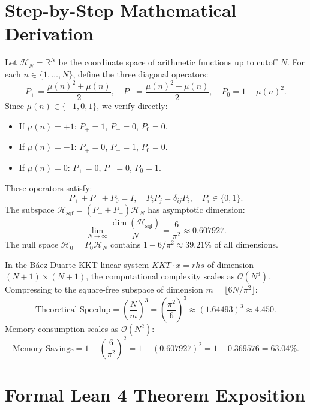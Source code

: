 \documentclass[11pt,a4paper]{article}
\theoremstyle{definition}
\begin{document}
\section{Step-by-Step Mathematical Derivation}

Let $\mathcal{H}_N = \mathbb{R}^N$ be the coordinate space of arithmetic functions up to cutoff $N$. For each $n \in \{1, \dots, N\}$, define the three diagonal operators:
\begin{equation}
P_+ = \frac{\mu(n)^2 + \mu(n)}{2}, \quad P_- = \frac{\mu(n)^2 - \mu(n)}{2}, \quad P_0 = 1 - \mu(n)^2.
\end{equation}
Since $\mu(n) \in \{-1, 0, 1\}$, we verify directly:
\begin{itemize}
\item If $\mu(n) = +1$: $P_+ = 1$, $P_- = 0$, $P_0 = 0$.
\item If $\mu(n) = -1$: $P_+ = 0$, $P_- = 1$, $P_0 = 0$.
\item If $\mu(n) = 0$: $P_+ = 0$, $P_- = 0$, $P_0 = 1$.
\end{itemize}
These operators satisfy:
\begin{equation}
P_+ + P_- + P_0 = I, \quad P_i P_j = \delta_{ij} P_i, \quad P_i \in \{0, 1\}.
\end{equation}
The subspace $\mathcal{H}_{\mathrm{sqf}} = (P_+ + P_-) \mathcal{H}_N$ has asymptotic dimension:
\begin{equation}
\lim_{N \to \infty} \frac{\dim(\mathcal{H}_{\mathrm{sqf}})}{N} = \frac{6}{\pi^2} \approx 0.607927.
\end{equation}
The null space $\mathcal{H}_0 = P_0 \mathcal{H}_N$ contains $1 - 6/\pi^2 \approx 39.21\%$ of all dimensions.

In the Báez-Duarte KKT linear system $KKT \cdot x = rhs$ of dimension $(N+1) \times (N+1)$, the computational complexity scales as $\mathcal{O}(N^3)$. Compressing to the square-free subspace of dimension $m = \lfloor 6N/\pi^2 \rfloor$:
\begin{equation}
\text{Theoretical Speedup} = \left(\frac{N}{m}\right)^3 = \left(\frac{\pi^2}{6}\right)^3 \approx (1.64493)^3 \approx 4.450.
\end{equation}
Memory consumption scales as $\mathcal{O}(N^2)$:
\begin{equation}
\text{Memory Savings} = 1 - \left(\frac{6}{\pi^2}\right)^2 = 1 - (0.607927)^2 = 1 - 0.369576 = 63.04\%.
\end{equation}


\section{Formal Lean 4 Theorem Exposition}
\end{document}
